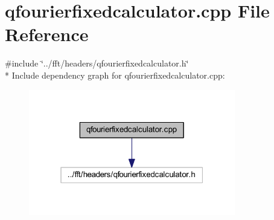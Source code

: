 \hypertarget{a00119}{\section{qfourierfixedcalculator.\+cpp File Reference}
\label{a00119}
}
{\ttfamily \#include \char`\"{}../fft/headers/qfourierfixedcalculator.\+h\char`\"{}}\\*
Include dependency graph for qfourierfixedcalculator.\+cpp\+:
\nopagebreak
\begin{figure}[H]
\begin{center}
\leavevmode
\includegraphics[width=256pt]{d4/db5/a00328}
\end{center}
\end{figure}
